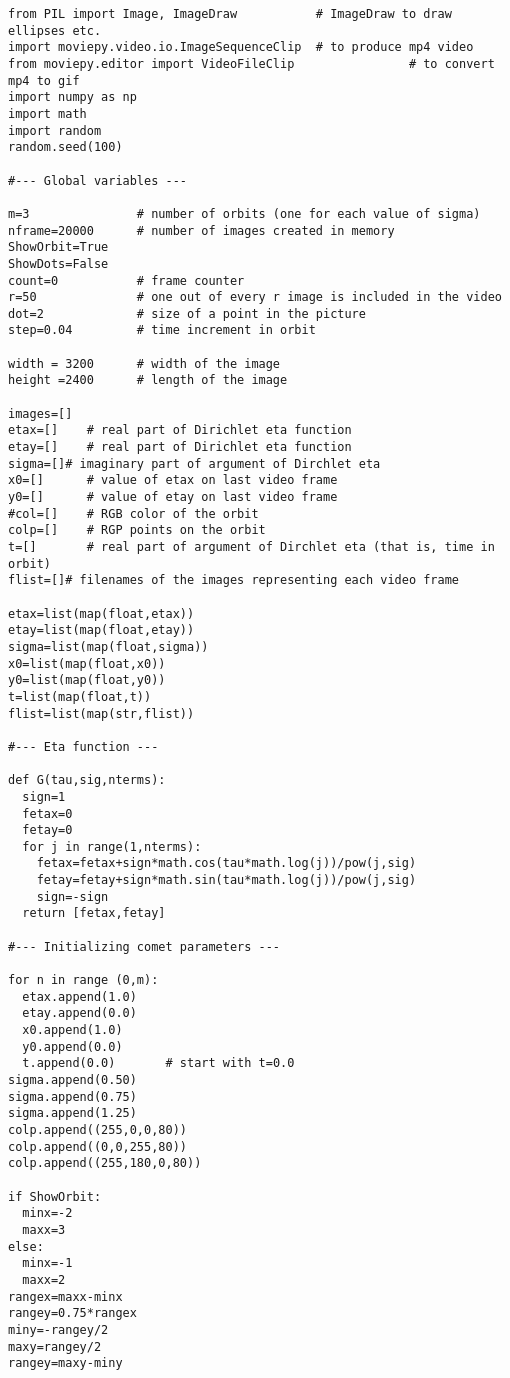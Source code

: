 \documentclass[oneside,10pt]{book}
\begin{document}
\begin{lstlisting}
from PIL import Image, ImageDraw           # ImageDraw to draw ellipses etc.
import moviepy.video.io.ImageSequenceClip  # to produce mp4 video
from moviepy.editor import VideoFileClip                # to convert mp4 to gif
import numpy as np
import math
import random
random.seed(100)

#--- Global variables ---

m=3               # number of orbits (one for each value of sigma) 
nframe=20000      # number of images created in memory
ShowOrbit=True 
ShowDots=False
count=0           # frame counter 
r=50              # one out of every r image is included in the video
dot=2             # size of a point in the picture
step=0.04         # time increment in orbit

width = 3200      # width of the image
height =2400      # length of the image

images=[]
etax=[]    # real part of Dirichlet eta function
etay=[]    # real part of Dirichlet eta function
sigma=[]# imaginary part of argument of Dirchlet eta
x0=[]      # value of etax on last video frame
y0=[]      # value of etay on last video frame
#col=[]    # RGB color of the orbit
colp=[]    # RGP points on the orbit
t=[]       # real part of argument of Dirchlet eta (that is, time in orbit)
flist=[]# filenames of the images representing each video frame

etax=list(map(float,etax))
etay=list(map(float,etay))
sigma=list(map(float,sigma))
x0=list(map(float,x0))
y0=list(map(float,y0))
t=list(map(float,t))
flist=list(map(str,flist))

#--- Eta function ---

def G(tau,sig,nterms):
  sign=1
  fetax=0
  fetay=0
  for j in range(1,nterms):
    fetax=fetax+sign*math.cos(tau*math.log(j))/pow(j,sig)
    fetay=fetay+sign*math.sin(tau*math.log(j))/pow(j,sig)
    sign=-sign
  return [fetax,fetay]

#--- Initializing comet parameters ---

for n in range (0,m):
  etax.append(1.0)
  etay.append(0.0)
  x0.append(1.0)
  y0.append(0.0)
  t.append(0.0)       # start with t=0.0
sigma.append(0.50)
sigma.append(0.75) 
sigma.append(1.25) 
colp.append((255,0,0,80))
colp.append((0,0,255,80))
colp.append((255,180,0,80))

if ShowOrbit:
  minx=-2 
  maxx=3
else:
  minx=-1
  maxx=2 
rangex=maxx-minx
rangey=0.75*rangex
miny=-rangey/2
maxy=rangey/2
rangey=maxy-miny


\end{lstlisting}
\end{document}
